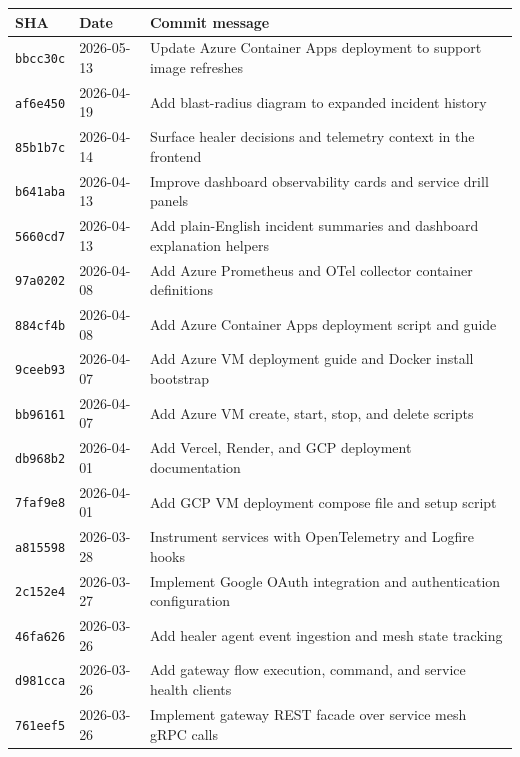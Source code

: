 \documentclass[11pt,letterpaper]{article}
\newcommand{\subhead}[1]{%
  \par\vspace{6pt}{\bfseries\color{InkBlack}#1}\par\vspace{2pt}
}
\begin{document}
\subhead{Commit log (16 commits on \texttt{main})}
\small
\begin{tabular}{@{}lll@{}}
\toprule
\textbf{SHA} & \textbf{Date} & \textbf{Commit message} \\
\midrule
\texttt{bbcc30c} & 2026-05-13 & Update Azure Container Apps deployment to support image refreshes \\
\texttt{af6e450} & 2026-04-19 & Add blast-radius diagram to expanded incident history \\
\texttt{85b1b7c} & 2026-04-14 & Surface healer decisions and telemetry context in the frontend \\
\texttt{b641aba} & 2026-04-13 & Improve dashboard observability cards and service drill panels \\
\texttt{5660cd7} & 2026-04-13 & Add plain-English incident summaries and dashboard explanation helpers \\
\texttt{97a0202} & 2026-04-08 & Add Azure Prometheus and OTel collector container definitions \\
\texttt{884cf4b} & 2026-04-08 & Add Azure Container Apps deployment script and guide \\
\texttt{9ceeb93} & 2026-04-07 & Add Azure VM deployment guide and Docker install bootstrap \\
\texttt{bb96161} & 2026-04-07 & Add Azure VM create, start, stop, and delete scripts \\
\texttt{db968b2} & 2026-04-01 & Add Vercel, Render, and GCP deployment documentation \\
\texttt{7faf9e8} & 2026-04-01 & Add GCP VM deployment compose file and setup script \\
\texttt{a815598} & 2026-03-28 & Instrument services with OpenTelemetry and Logfire hooks \\
\texttt{2c152e4} & 2026-03-27 & Implement Google OAuth integration and authentication configuration \\
\texttt{46fa626} & 2026-03-26 & Add healer agent event ingestion and mesh state tracking \\
\texttt{d981cca} & 2026-03-26 & Add gateway flow execution, command, and service health clients \\
\texttt{761eef5} & 2026-03-26 & Implement gateway REST facade over service mesh gRPC calls \\
\bottomrule
\end{tabular}
\normalsize
\end{document}
